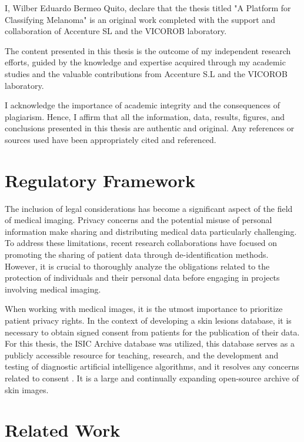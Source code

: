 I, Wilber Eduardo Bermeo Quito, declare that the thesis titled "A Platform for
Classifying Melanoma" is an original work completed with the support and
collaboration of Accenture SL and the VICOROB laboratory. \newline

The content presented in this thesis is the outcome of my independent research
efforts, guided by the knowledge and expertise acquired through my academic
studies and the valuable contributions from Accenture S.L and the VICOROB
laboratory. \newline

I acknowledge the importance of academic integrity and the consequences of
plagiarism. Hence, I affirm that all the information, data, results, figures,
and conclusions presented in this thesis are authentic and original. Any
references or sources used have been appropriately cited and referenced.

\section{Regulatory Framework}

The inclusion of legal considerations has become a significant aspect of the
field of medical imaging. Privacy concerns and the potential misuse of personal
information make sharing and distributing medical data particularly
challenging. To address these limitations, recent research collaborations have
focused on promoting the sharing of patient data through de-identification
methods. However, it is crucial to thoroughly analyze the obligations related
to the protection of individuals and their personal data before engaging in
projects involving medical imaging. \newline

When working with medical images, it is the utmost importance to prioritize
patient privacy rights. In the context of developing a skin lesions database,
it is necessary to obtain signed consent from patients for the publication of
their data. For this thesis, the ISIC Archive database was utilized, this
database serves as a publicly accessible resource for teaching, research, and
the development and testing of diagnostic artificial intelligence algorithms,
and it resolves any concerns related to consent \cite{IsicArchive}. It is a
large and continually expanding open-source archive of skin images.

\section{Related Work}

